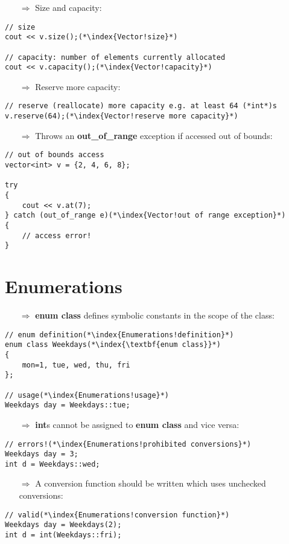 \documentclass[10pt]{article}
\begin{document}
\begin{enumerate}
\item[$\Rightarrow$] Size and capacity:
\end{enumerate}
\begin{lstlisting}
// size
cout << v.size();(*\index{Vector!size}*)

// capacity: number of elements currently allocated
cout << v.capacity();(*\index{Vector!capacity}*)
\end{lstlisting}
\begin{enumerate}
\item[$\Rightarrow$] Reserve more capacity:
\end{enumerate}
\begin{lstlisting}
// reserve (reallocate) more capacity e.g. at least 64 (*int*)s
v.reserve(64);(*\index{Vector!reserve more capacity}*)
\end{lstlisting}
\begin{enumerate}
\item[$\Rightarrow$] Throws an \textbf{out\_of\_range} exception if accessed out of bounds:
\end{enumerate}
\begin{lstlisting}
// out of bounds access
vector<int> v = {2, 4, 6, 8};

try
{
    cout << v.at(7);
} catch (out_of_range e)(*\index{Vector!out of range exception}*)
{
    // access error!
}
\end{lstlisting}
%
%
\section{Enumerations}
\small
\begin{enumerate}
\item[$\Rightarrow$] \textbf{enum class} defines symbolic constants in the scope of the class:
\end{enumerate}
\begin{lstlisting}
// enum definition(*\index{Enumerations!definition}*)
enum class Weekdays(*\index{\textbf{enum class}}*)
{
    mon=1, tue, wed, thu, fri
};

// usage(*\index{Enumerations!usage}*)
Weekdays day = Weekdays::tue;
\end{lstlisting}
\begin{enumerate}
\item[$\Rightarrow$] \textbf{int}s cannot be assigned to \textbf{enum class} and vice versa:
\end{enumerate}
\begin{lstlisting}
// errors!(*\index{Enumerations!prohibited conversions}*)
Weekdays day = 3;
int d = Weekdays::wed;
\end{lstlisting}
\begin{enumerate}
\item[$\Rightarrow$] A conversion function should be written which uses unchecked conversions:
\end{enumerate}
\begin{lstlisting}
// valid(*\index{Enumerations!conversion function}*)
Weekdays day = Weekdays(2);
int d = int(Weekdays::fri);
\end{lstlisting}
%
%
\end{document}
